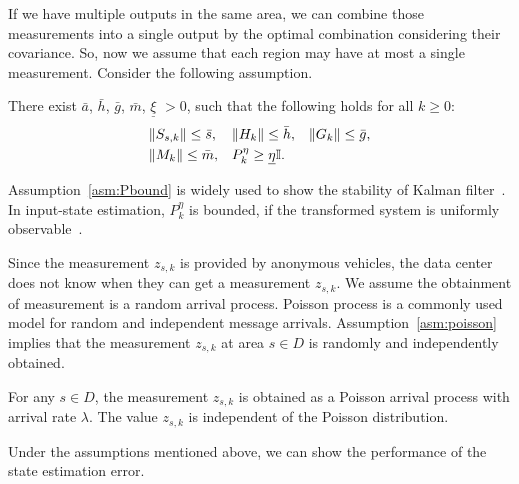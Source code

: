 \documentclass[letterpaper, 10 pt, conference]{ieeeconf}
\begin{document}
If we have multiple outputs in the same area, we can combine those measurements into a single output by the optimal combination considering their covariance.
So, now we assume that each region may have at most a single measurement.
Consider the following assumption.
\begin{assumption}\label{asm:Pbound}
    There exist $\bar{a}$, $\bar{h}$, $\bar{g}$, $\bar{m}$, $\underline{\xi}$ $>0$, such that the following holds for all $k \geq 0$:
    \begin{align*}
        &\|S_{s,k}\| \leq \bar{s},
        &&\|H_{k}\| \leq \bar{h},
        &&\|G_{k}\| \leq \bar{g},\\
        & \|M_{k}\| \leq \bar{m},
        &&P_k^{\eta}\geq \underline{\eta} \mathbb{I}.
\end{align*}
\end{assumption}

Assumption~\ref{asm:Pbound} is  widely used to show the stability of Kalman filter~\cite{reif1999stochastic,bonnabel2014contraction}.
In input-state estimation, $P_k^\eta$ is bounded, if the transformed system is uniformly observable~\cite{wan2019attack}. 

Since the measurement $z_{s,k}$ is provided by anonymous vehicles, the data center does not know when they can get a measurement $z_{s,k}$. We assume the obtainment of measurement is a random arrival process.
Poisson process is a commonly used model for random and independent message arrivals. Assumption~\ref{asm:poisson} implies that the measurement $z_{s,k}$ at area $s \in D$ is randomly  and independently obtained.
\begin{assumption}
For any $s \in D$, the measurement $z_{s,k}$ is obtained as a Poisson arrival process with arrival rate $\lambda$. The value $z_{s,k}$ is independent of the Poisson distribution.
\label{asm:poisson}
\end{assumption}

Under the assumptions mentioned above, we can show the performance of the state estimation error.
\end{document}
